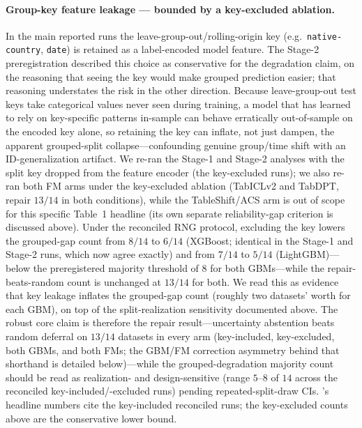 \documentclass[pdflatex,sn-mathphys-num]{sn-jnl}
\begin{document}
\paragraph{Group-key feature leakage --- bounded by a key-excluded ablation.} In the main reported runs the
leave-group-out/rolling-origin key (e.g.\ \texttt{native-country}, \texttt{date}) is retained as a
label-encoded model feature. The Stage-2 preregistration described this choice as conservative for the
degradation claim, on the reasoning that seeing the key would make grouped prediction easier; that
reasoning understates the risk in the other direction. Because leave-group-out test keys take categorical
values never seen during training, a model that has learned to rely on key-specific patterns in-sample can
behave erratically out-of-sample on the encoded key alone, so retaining the key can inflate, not just
dampen, the apparent grouped-split collapse---confounding genuine group/time shift with an ID-generalization
artifact. We re-ran the Stage-1 and Stage-2 analyses with the split key dropped from the feature encoder (the
key-excluded runs); we also re-ran both FM arms under the key-excluded
ablation (TabICLv2 and TabDPT, repair $13/14$ in both conditions), while the TableShift/ACS arm is out of scope
for this specific Table~1 headline (its own separate reliability-gap criterion is discussed above). Under the reconciled RNG
protocol, excluding the key lowers the grouped-gap count from $8/14$ to $6/14$ (XGBoost; identical in the
Stage-1 and Stage-2 runs, which now agree exactly) and from $7/14$ to $5/14$ (LightGBM)---below the
preregistered majority threshold of $8$ for both GBMs---while the repair-beats-random count is unchanged
at $13/14$ for both. We read this as evidence that key leakage inflates the grouped-gap count (roughly
two datasets' worth for each GBM), on top of the split-realization sensitivity documented above. The
robust core claim is therefore the repair result---uncertainty abstention beats random deferral on
$13/14$ datasets in every arm (key-included, key-excluded, both GBMs, and both FMs; the GBM/FM correction
asymmetry behind that shorthand is detailed below)---while the grouped-degradation majority count should be
read as realization- and design-sensitive (range $5$--$8$ of $14$ across the reconciled
key-included/-excluded runs) pending repeated-split-draw CIs. 's headline numbers cite the
key-included reconciled runs; the key-excluded counts above are the conservative lower bound.
\end{document}
